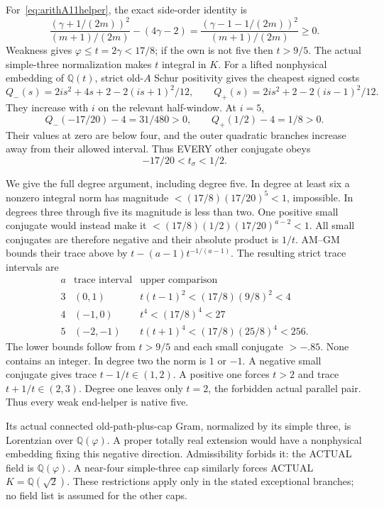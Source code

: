 \documentclass[11pt]{article}
\begin{document}
For~\eqref{eq:arithA11helper}, the exact
side-order identity is
\[
 {\frac{(\gamma+1/(2m))^2}{(m+1)/(2m)}}
                 -(4\gamma-2)
 ={\frac{(\gamma-1-1/(2m))^2}{(m+1)/(2m)}}\ge0 .
\]
Weakness gives \(\varphi\le t=2\gamma<17/8\);
if the own is not five then \(t>9/5\).
The actual simple-three normalization makes
\(t\) integral in \(K\).
For a lifted nonphysical embedding of
\(\mathbb Q(t)\), strict old-\(A\) Schur
positivity gives the cheapest signed costs
\[
 Q_-(s)=2is^2+4s+2-2(is+1)^2/12,\qquad
 Q_+(s)=2is^2+2-2(is-1)^2/12 .
\]
They increase with \(i\) on the relevant
half-window.  At \(i=5\),
\[
 Q_-(-17/20)-4=31/480>0,\qquad
 Q_+(1/2)-4=1/8>0 .
\]
Their values at zero are below four, and
the outer quadratic branches increase away
from their allowed interval.
Thus EVERY other conjugate obeys
\[
                    -17/20<t_\sigma<1/2 .
\tag{A11strip}\label{eq:arithA11strip}
\]

We give the full degree argument, including
degree five.  In degree at least six a
nonzero integral norm has magnitude
\(<(17/8)(17/20)^5<1\), impossible.
In degrees three through five its magnitude
is less than two.
One positive small conjugate would instead
make it \(<(17/8)(1/2)(17/20)^{a-2}<1\).
All small conjugates are therefore negative
and their absolute product is \(1/t\).
AM--GM bounds their trace above by
\(t-(a-1)t^{-1/(a-1)}\).
The resulting strict trace intervals are
\[
 \begin{array}{c|c|c}
 a&\text{trace interval}&\text{upper comparison}\\ \hline
 3&(0,1)&t(t-1)^2<(17/8)(9/8)^2<4\\
 4&(-1,0)&t^4<(17/8)^4<27\\
 5&(-2,-1)&t(t+1)^4<(17/8)(25/8)^4<256 .
 \end{array}
\]
The lower bounds follow from
\(t>9/5\) and each small conjugate \(>-.85\).
None contains an integer.
In degree two the norm is \(1\) or \(-1\).
A negative small conjugate gives trace
\(t-1/t\in(1,2)\).
A positive one forces \(t>2\) and trace
\(t+1/t\in(2,3)\).
Degree one leaves only \(t=2\), the
forbidden actual parallel pair.
Thus every weak end-helper is native five.

Its actual connected old-path-plus-cap Gram,
normalized by its simple three, is Lorentzian
over \(\mathbb Q(\varphi)\).
A proper totally real extension would have
a nonphysical embedding fixing this negative
direction.  Admissibility forbids it:
the ACTUAL field is \(\mathbb Q(\varphi)\).
A near-four simple-three cap similarly forces
ACTUAL \(K=\mathbb Q(\sqrt2)\).
These restrictions apply only in the stated
exceptional branches; no field list is assumed
for the other caps.
\end{document}
